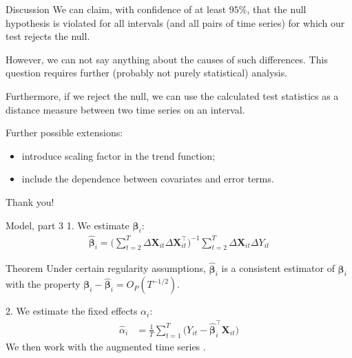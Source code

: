 \documentclass[10pt, handout]{beamer}
\newcommand{\X}{\boldsymbol{X}}
\newcommand{\bfbeta}{\boldsymbol{\beta}}
\begin{document}
\begin{frame}{Discussion}
We can claim, with confidence of at least $95\%$, that the null hypothesis is violated for all intervals (and all pairs of time series) for which our test rejects the null. \pause

However, we can not say anything about the causes of such differences. This question requires further (probably not purely statistical) analysis.\pause

Furthermore, if we reject the null, we can use the calculated test statistics as a distance measure between two time series on an interval.\pause

Further possible extensions:
\vspace{-1mm}
\begin{itemize}
	\item introduce scaling factor in the trend function;\pause
	\item include the dependence between covariates and error terms.
\end{itemize}
\end{frame}

\begin{frame}[standout]
  Thank you!
\end{frame}


\appendix


\begin{frame}{Model, part 3}
1. We estimate $\bfbeta_i$:
\begin{align*}
\widehat{\bfbeta}_i = \Big( \sum_{t=2}^T \Delta \X_{it} \Delta \X_{it}^\top \Big)^{-1} \sum_{t=2}^T \Delta \X_{it} \Delta Y_{it}
\end{align*}
\vspace{-3mm}
\begin{block}{Theorem}
Under certain regularity assumptions, $\widehat{\bfbeta}_i$ is a consistent estimator of $\bfbeta_i$ with the property $\bfbeta_i - \widehat{\bfbeta}_i = O_P(T^{-1/2})$.
\end{block}
2. We estimate the fixed effects $\alpha_i$:
\begin{align*}
\widehat{\alpha}_i &= \frac{1}{T}\sum_{t=1}^T \big(Y_{it} - \widehat{\bfbeta}_i^\top \X_{it}\big)
\end{align*}
We then work with the augmented time series \color{mLightBrown}{$\widehat{Y}_{it} = Y_{it} - \widehat{\alpha}_i - \widehat{\bfbeta}_i^\top \X_{it}$}.
\end{frame}
\end{document}
